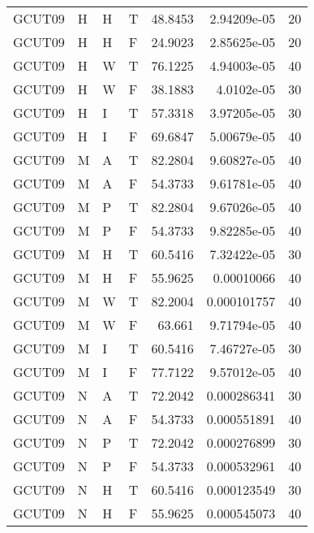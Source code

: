 \begin{longtable}{llllrrr}
    GCUT09   & H     & H     & T          & 48.8453    & 2.94209e-05 & 20       \\
    GCUT09   & H     & H     & F          & 24.9023    & 2.85625e-05 & 20       \\
    GCUT09   & H     & W     & T          & 76.1225    & 4.94003e-05 & 40       \\
    GCUT09   & H     & W     & F          & 38.1883    & 4.0102e-05  & 30       \\
    GCUT09   & H     & I     & T          & 57.3318    & 3.97205e-05 & 30       \\
    GCUT09   & H     & I     & F          & 69.6847    & 5.00679e-05 & 40       \\
    GCUT09   & M     & A     & T          & 82.2804    & 9.60827e-05 & 40       \\
    GCUT09   & M     & A     & F          & 54.3733    & 9.61781e-05 & 40       \\
    GCUT09   & M     & P     & T          & 82.2804    & 9.67026e-05 & 40       \\
    GCUT09   & M     & P     & F          & 54.3733    & 9.82285e-05 & 40       \\
    GCUT09   & M     & H     & T          & 60.5416    & 7.32422e-05 & 30       \\
    GCUT09   & M     & H     & F          & 55.9625    & 0.00010066  & 40       \\
    GCUT09   & M     & W     & T          & 82.2004    & 0.000101757 & 40       \\
    GCUT09   & M     & W     & F          & 63.661     & 9.71794e-05 & 40       \\
    GCUT09   & M     & I     & T          & 60.5416    & 7.46727e-05 & 30       \\
    GCUT09   & M     & I     & F          & 77.7122    & 9.57012e-05 & 40       \\
    GCUT09   & N     & A     & T          & 72.2042    & 0.000286341 & 30       \\
    GCUT09   & N     & A     & F          & 54.3733    & 0.000551891 & 40       \\
    GCUT09   & N     & P     & T          & 72.2042    & 0.000276899 & 30       \\
    GCUT09   & N     & P     & F          & 54.3733    & 0.000532961 & 40       \\
    GCUT09   & N     & H     & T          & 60.5416    & 0.000123549 & 30       \\
    GCUT09   & N     & H     & F          & 55.9625    & 0.000545073 & 40       \\

\end{longtable}
